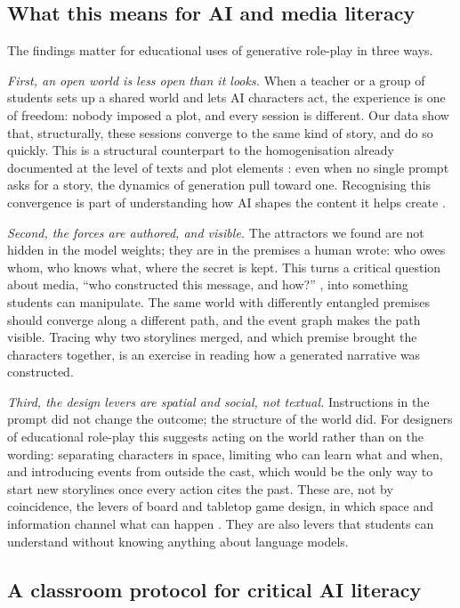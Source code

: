 \documentclass[12pt]{article}
\begin{document}
\subsection{What this means for AI and media literacy}

The findings matter for educational uses of generative role-play in three
ways.

\emph{First, an open world is less open than it looks.} When a teacher or a
group of students sets up a shared world and lets AI characters act, the
experience is one of freedom: nobody imposed a plot, and every session is
different. Our data show that, structurally, these sessions converge to the
same kind of story, and do so quickly. This is a structural counterpart to
the homogenisation already documented at the level of texts and plot
elements \parencite{doshi2024,xu2025}: even when no single prompt asks for a
story, the dynamics of generation pull toward one. Recognising this
convergence is part of understanding how AI shapes the content it helps
create \parencite{long2020,unesco2024}.

\emph{Second, the forces are authored, and visible.} The attractors we found
are not hidden in the model weights; they are in the premises a human wrote:
who owes whom, who knows what, where the secret is kept. This turns a
critical question about media, \enquote{who constructed this message, and
how?} \parencite{hobbs2010}, into something students can manipulate. The
same world with differently entangled premises should converge along a
different path, and the event graph makes the path visible. Tracing why two
storylines merged, and which premise brought the characters together, is
an exercise in reading how a generated narrative was constructed.

\emph{Third, the design levers are spatial and social, not textual.}
Instructions in the prompt did not change the outcome; the structure of the
world did. For designers of educational role-play this suggests acting on
the world rather than on the wording: separating characters in space,
limiting who can learn what and when, and introducing events from outside
the cast, which would be the only way to start new storylines once every
action cites the past. These are, not by coincidence, the levers of board
and tabletop game design, in which space and information channel what can
happen \parencite{jenkins2004,salen2004}. They are also levers that
students can understand without knowing anything about language models.

\subsection{A classroom protocol for critical AI literacy}
\end{document}
